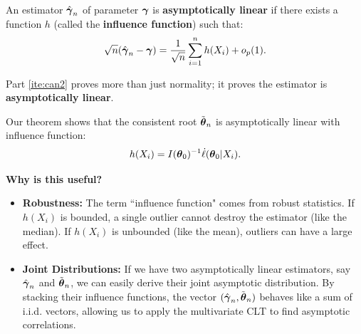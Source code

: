     \begin{definition}
    An estimator \(\hat{\boldsymbol{\gamma}}_n\) of parameter \(\boldsymbol{\gamma}\) is \textbf{asymptotically linear} if there exists a function \(h\) (called the \textbf{influence function}) such that:
    \[ \sqrt{n}(\hat{\boldsymbol{\gamma}}_n - \boldsymbol{\gamma}) = \frac{1}{\sqrt{n}} \sum_{i=1}^n h(X_i) + o_p(1). \]
    \end{definition}

\begin{remark}
    Part \ref{ite:can2} proves more than just normality; it proves the estimator is \textbf{asymptotically linear}.
    

    Our theorem shows that the consistent root \(\tilde{\boldsymbol{\theta}}_n\) is asymptotically linear with influence function:
    \[ h(X_i) = I(\boldsymbol{\theta}_0)^{-1} \dot{\ell}(\boldsymbol{\theta}_0 | X_i). \]
    
    \textbf{Why is this useful?}
    \begin{itemize}
        \item \textbf{Robustness:} The term ``influence function" comes from robust statistics. If \(h(X_i)\) is bounded, a single outlier cannot destroy the estimator (like the median). If \(h(X_i)\) is unbounded (like the mean), outliers can have a large effect.
        \item \textbf{Joint Distributions:} If we have two asymptotically linear estimators, say \(\hat{\boldsymbol{\gamma}}_n\) and \(\tilde{\boldsymbol{\theta}}_n\), we can easily derive their joint asymptotic distribution. By stacking their influence functions, the vector \((\hat{\boldsymbol{\gamma}}_n, \tilde{\boldsymbol{\theta}}_n)\) behaves like a sum of i.i.d. vectors, allowing us to apply the multivariate CLT to find asymptotic correlations.
    \end{itemize}
\end{remark}

